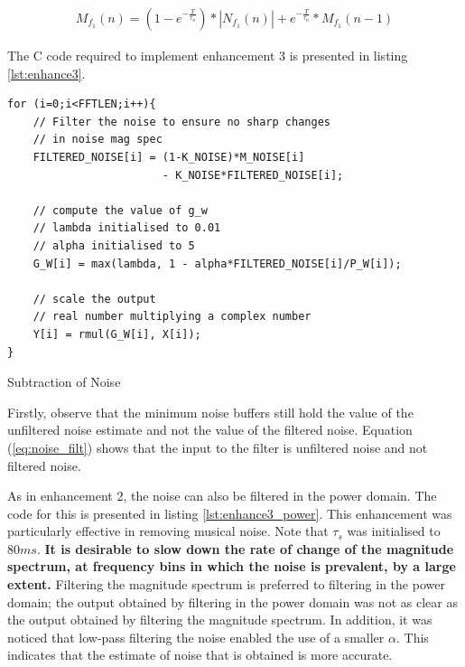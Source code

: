 \documentclass[a4paper,pra,twocolumn,10pt,aps,longbibliography,nobalancelastpage]{revtex4-1}
\begin{document}
\begin{align}
    M_{f_{1}}(n) = (1 - e^{-\frac{T}{\tau_{n}}})*|N_{f_{1}}(n)| + e^{-\frac{T}{\tau_{n}}}*M_{f_{1}}(n-1)\label{eq:noise_filt}
\end{align}

The C code required to implement enhancement 3 is presented in listing \ref{lst:enhance3}. 

\begin{listing}[H]
\begin{verbatim}
for (i=0;i<FFTLEN;i++){
    // Filter the noise to ensure no sharp changes 
    // in noise mag spec
    FILTERED_NOISE[i] = (1-K_NOISE)*M_NOISE[i] 
                        - K_NOISE*FILTERED_NOISE[i];
    
    // compute the value of g_w
    // lambda initialised to 0.01
    // alpha initialised to 5
    G_W[i] = max(lambda, 1 - alpha*FILTERED_NOISE[i]/P_W[i]);
    
    // scale the output
    // real number multiplying a complex number
    Y[i] = rmul(G_W[i], X[i]);
}
\end{verbatim}
\caption{Subtraction of Noise} 
\label{lst:enhance3}
\end{listing}

Firstly, observe that the minimum noise buffers still hold the value of the unfiltered noise estimate and not the value of the filtered noise. Equation (\ref{eq:noise_filt}) shows that the input to the filter is unfiltered noise and not filtered noise.

As in enhancement 2, the noise can also be filtered in the power domain. The code for this is presented in listing \ref{lst:enhance3_power}. This enhancement was particularly effective in removing musical noise. Note that $\tau_{s}$ was initialised to $80ms$. \textbf{It is desirable to slow down the rate of change of the magnitude spectrum, at frequency bins in which the noise is prevalent, by a large extent.} Filtering the magnitude spectrum is preferred to filtering in the power domain; the output obtained by filtering in the power domain was not as clear as the output obtained by filtering the magnitude spectrum. In addition, it was noticed that low-pass filtering the noise enabled the use of a smaller $\alpha$. This indicates that the estimate of noise that is obtained is more accurate.
\end{document}
